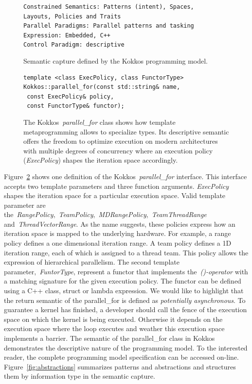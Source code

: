 \begin{figure}[h]
\begin{Verbatim}[frame=leftline]
Constrained Semantics: Patterns (intent), Spaces, 
Layouts, Policies and Traits
Parallel Paradigms: Parallel patterns and tasking
Expression: Embedded, C++
Control Paradigm: descriptive
\end{Verbatim}
\caption{Semantic capture defined by the Kokkos programming model.}
\label{fig:SemCaptureKokkos}
\end{figure}

\begin{figure}
\begin{Verbatim}[frame=leftline]
template <class ExecPolicy, class FunctorType>
Kokkos::parallel_for(const std::string& name, 
 const ExecPolicy& policy, 
 const FunctorType& functor);
\end{Verbatim}
\caption{The Kokkos~\emph{parallel\_for} class shows how template metaprogramming allows to specialize types. Its descriptive semantic offers the freedom to optimize execution on modern architectures with multiple degrees of concurrency where an execution policy (\emph{ExecPolicy}) shapes the iteration space accordingly.}
\label{fig:parallelFor}
\end{figure}

Figure~\ref{fig:parallelFor} shows one definition of the Kokkos~\emph{parallel\_for} interface. This interface accepts two template parameters and three function arguments. \emph{ExecPolicy} shapes the iteration space for a particular execution space. Valid template parameter are the~\emph{RangePolicy},~\emph{TeamPolicy},~\emph{MDRangePolicy},~\emph{TeamThreadRange} and~\emph{ThreadVectorRange}. As the name suggests, these policies express how an iteration space is mapped to the underlying hardware. For example, a range policy defines a one dimensional iteration range. A team policy defines a 1D iteration range, each of which is assigned to a thread team. This policy allows the expression of hierarchical parallelism. The second template parameter,~\emph{FuntorType}, represent a functor that implements the~\emph{()-operator} with a matching signature for the given execution policy. The functor can be defined using a C++ class, struct or lambda expression. We would like to highlight that the return semantic of the parallel\_for is defined as \emph{potentially asynchronous}. To guarantee a kernel has finished, a developer should call the fence of the execution space on which the kernel is being executed. Otherwise it depends on the execution space where the loop executes and weather this execution space implements a barrier. The semantic of the parallel\_for class in Kokkos demonstrates the descriptive nature of the programming model. To the interested reader, the complete programming model specification can be accessed on-line\cite{pub:KOKKOS}. Figure~\ref{fig:abstractions} summarizes patterns and abstractions and structures them by information type in the semantic capture.

